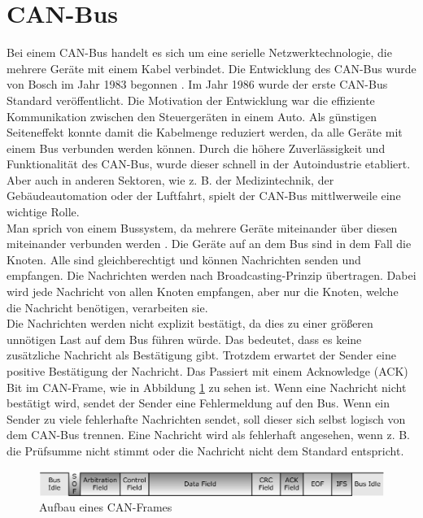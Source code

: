 \section{CAN-Bus}
Bei einem CAN-Bus handelt es sich um eine serielle Netzwerktechnologie, 
die mehrere Geräte mit einem Kabel verbindet.
Die Entwicklung des CAN-Bus wurde von Bosch im Jahr 1983 begonnen \cite[Seiten 2--10]{Voss2008}. 
Im Jahr 1986 wurde der erste CAN-Bus Standard 
veröffentlicht.
Die Motivation der Entwicklung war die effiziente Kommunikation zwischen den Steuergeräten in einem Auto. 
Als günstigen
Seiteneffekt konnte damit die Kabelmenge reduziert werden, da alle Geräte mit einem Bus verbunden werden können.
Durch die höhere Zuverlässigkeit und Funktionalität des CAN-Bus, wurde dieser schnell in der Autoindustrie etabliert.
Aber auch in anderen Sektoren, wie z. B. der Medizintechnik, der Gebäudeautomation oder der Luftfahrt, spielt der
CAN-Bus mittlwerweile eine wichtige Rolle.
\\
Man sprich von einem Bussystem, da mehrere Geräte miteinander über diesen miteinander verbunden werden \cite[Seiten 13--19]{Voss2008}. 
Die Geräte auf an dem Bus sind in dem Fall die Knoten. Alle sind gleichberechtigt und können Nachrichten senden und empfangen.
Die Nachrichten werden nach Broadcasting-Prinzip übertragen. Dabei wird jede Nachricht von allen Knoten empfangen, 
aber nur die Knoten, welche die Nachricht benötigen, verarbeiten sie. \\
Die Nachrichten werden nicht explizit bestätigt, da dies zu einer größeren unnötigen Last auf dem Bus führen würde.
Das bedeutet, dass es keine zusätzliche Nachricht als Bestätigung gibt.
Trotzdem erwartet der Sender eine positive Bestätigung der Nachricht. Das Passiert mit einem Acknowledge (ACK) Bit 
im CAN-Frame, wie in Abbildung \ref{fig:canframe} zu sehen ist. Wenn eine Nachricht nicht bestätigt wird, 
sendet der Sender eine Fehlermeldung auf den Bus. Wenn ein Sender zu viele fehlerhafte Nachrichten sendet, soll
dieser sich selbst logisch von dem CAN-Bus trennen. Eine Nachricht wird als fehlerhaft angesehen, wenn z. B. die Prüfsumme
nicht stimmt oder die Nachricht nicht dem Standard entspricht.

\begin{figure}[H]
    \centering
    \includegraphics[scale=0.25]{images/canFrame.png}
    \caption{Aufbau eines CAN-Frames \cite{Voss2008}}
    \label{fig:canframe}
\end{figure}

